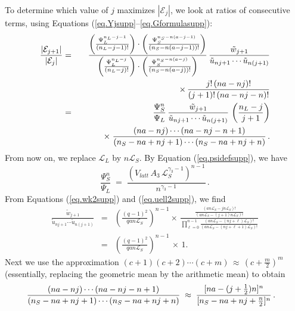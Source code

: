 \documentclass[journal=mamobx,manuscript=article]{achemso}
\newcommand{\leng}{\mathcal{L}}
\begin{document}
To determine which value of $j$ maximizes $|\mathcal{E}_j|$, we look at ratios of consecutive terms, using Equations (\ref{eq.Yjsupp}--\ref{eq.Gformulasupp}):
\begin{eqnarray}
    \frac{|\mathcal{E}_{j+1}|}{|\mathcal{E}_j|}   & = & 
 \frac{
     \left(\frac{\Psi_L^{n_{L}-j-1}}{(n_L-j-1)!}\right)\cdot\left(\frac{\Psi_S^{n_S-n(a-j-1)}}{
    (n_S-n(a-j-1))!}\right) 
      }{
 \left(\frac{\Psi_L^{n_{L}-j}}{(n_L-j)!}\right)\cdot\left(\frac{\Psi_S^{n_S-n(a-j)}}{
    (n_S-n(a-j))!}\right)  }  \,   \frac{\tilde{w}_{j+1} }{  \tilde{u}_{nj+1}\cdots \tilde{u}_{n(j+1)} } 
    \nonumber \\
    & & \hspace{42mm}  
     \times   \, \frac{ j! \, (na-nj)!}{(j+1)!\, (na-nj-n)!}  
    \nonumber    \\
    & = & \frac{\Psi_S^n}{\Psi_L}
    \,   \frac{\tilde{w}_{j+1} }{  \tilde{u}_{nj+1}\cdots \tilde{u}_{n(j+1)} }   \,\left(  \frac{n_L-j}{j+1}\right)
    \nonumber \\
    & &   \hspace{8mm}  \times \;  \frac{(na-nj)\cdots (na-nj-n+1)}{(n_S-na+nj+1)\cdots(n_S-na+nj+n)} \,.
        \label{eq.Yratio1supp}
\end{eqnarray}
From now on, we replace $\leng_L$ by $n\leng_S$.
By Equation (\ref{eq.psidefsupp}), we have
\begin{equation}
   \label{eq.psiratiosupp} 
      \frac{\Psi_S^n}{\Psi_L}   \;=\;   \frac{ (V_{latt}\, A_3 \,\leng_S^{\gamma_3-1})^{n-1}}{n^{\gamma_3-1}}\,.
\end{equation}
From Equations (\ref{eq.wk2supp}) and (\ref{eq.uell2supp}), we find
\begin{eqnarray}
     \frac{\tilde{w}_{j+1} }{  \tilde{u}_{nj+1}\cdots \tilde{u}_{n(j+1)} }  & = & 
        \left( \frac{(q-1)^2}{qan\leng_S}\right)^{n-1}   \times \,
    \frac{   \frac{(an\leng_S-jn\leng_S)!}{(an\leng_S-(j+1)n\leng_S)!}  }{
        \prod_{\ell=0}^{n-1} \frac{ (an\leng_S-(nj+\ell)\leng_S)!}{(an\leng_S-(nj+\ell+1)\leng_S)!}   }
     \nonumber  \\
     & = & \left( \frac{(q-1)^2}{qan\leng_S}\right)^{n-1}  \,\times\, 1.
     \label{eq.Yratioasupp}     
\end{eqnarray}
Next we use the approximation   $(c+1)(c+2)\cdots (c+m) \,\approx \,(c+\frac{m}{2})^m$
(essentially, replacing the geometric mean by the arithmetic mean) to obtain
\begin{equation}
       \frac{(na-nj)\cdots (na-nj-n+1)}{(n_S-na+nj+1)\cdots(n_S-na+nj+n)} 
       \; \approx \;    \frac{ [na-(j+\frac{1}{2})n]^n }{ [n_S-na+nj+\frac{n}{2}]^n} \,.\hspace{3mm}
      \label{eq.Yratiobsupp}
\end{equation} 
\end{document}
